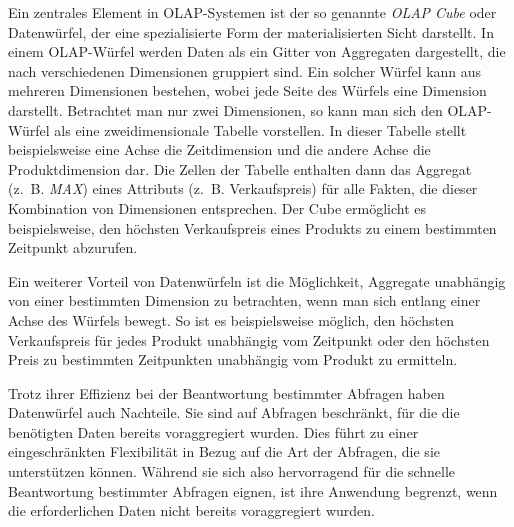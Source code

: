 Ein zentrales Element in OLAP-Systemen ist der so genannte \emph{OLAP Cube} oder Datenwürfel, der eine spezialisierte Form der materialisierten Sicht darstellt. In einem OLAP-Würfel werden Daten als ein Gitter von Aggregaten dargestellt, die nach verschiedenen Dimensionen gruppiert sind. Ein solcher Würfel kann aus mehreren Dimensionen bestehen, wobei jede Seite des Würfels eine Dimension darstellt. Betrachtet man nur zwei Dimensionen, so kann man sich den OLAP-Würfel als eine zweidimensionale Tabelle vorstellen. In dieser Tabelle stellt beispielsweise eine Achse die Zeitdimension und die andere Achse die Produktdimension dar. Die Zellen der Tabelle enthalten dann das Aggregat (z.~B. \emph{MAX}) eines Attributs (z.~B. Verkaufspreis) für alle Fakten, die dieser Kombination von Dimensionen entsprechen. Der Cube ermöglicht es beispielsweise, den höchsten Verkaufspreis eines Produkts zu einem bestimmten Zeitpunkt abzurufen.

Ein weiterer Vorteil von Datenwürfeln ist die Möglichkeit, Aggregate unabhängig von einer bestimmten Dimension zu betrachten, wenn man sich entlang einer Achse des Würfels bewegt. So ist es beispielsweise möglich, den höchsten Verkaufspreis für jedes Produkt unabhängig vom Zeitpunkt oder den höchsten Preis zu bestimmten Zeitpunkten unabhängig vom Produkt zu ermitteln.

Trotz ihrer Effizienz bei der Beantwortung bestimmter Abfragen haben Datenwürfel auch Nachteile. Sie sind auf Abfragen beschränkt, für die die benötigten Daten bereits voraggregiert wurden. Dies führt zu einer eingeschränkten Flexibilität in Bezug auf die Art der Abfragen, die sie unterstützen können. Während sie sich also hervorragend für die schnelle Beantwortung bestimmter Abfragen eignen, ist ihre Anwendung begrenzt, wenn die erforderlichen Daten nicht bereits voraggregiert wurden.

